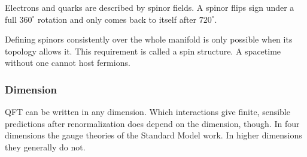 Electrons and quarks are described by spinor fields.
A spinor flips sign under a full $360^\circ$ rotation and only comes back to itself after $720^\circ$.

Defining spinors consistently over the whole manifold is only possible when its topology allows it.
This requirement is called a spin structure.
A spacetime without one cannot host fermions.

\subsubsection{Dimension}

QFT can be written in any dimension.
Which interactions give finite, sensible predictions after renormalization does depend on the dimension, though.
In four dimensions the gauge theories of the Standard Model work.
In higher dimensions they generally do not.

